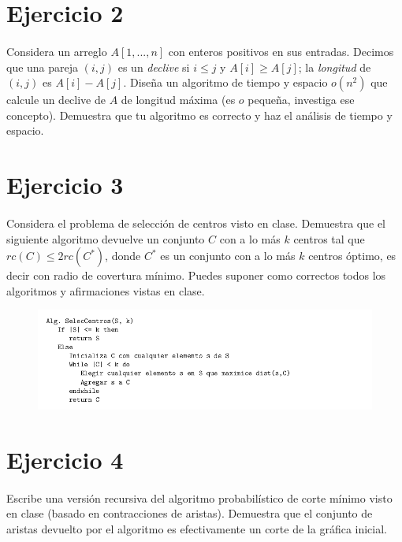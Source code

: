 \documentclass[12pt]{article}
\begin{document}
\section{Ejercicio 2}
	\paragraph{} Considera un arreglo $A[1,...,n]$ con enteros positivos en sus entradas. Decimos que una pareja $(i,j)$ es un \textit{declive} si $i\leq j$ y $A[i]\geq A[j]$; la \textit{longitud} de $(i,j)$ es $A[i] - A[j]$. Diseña un algoritmo de tiempo y espacio $o(n^2)$ que calcule un declive de $A$ de longitud máxima (es $o$ pequeña, investiga ese concepto). Demuestra que tu algoritmo es correcto y haz el análisis de tiempo y espacio.
\section{Ejercicio 3}
	\paragraph{} Considera el problema de selección de centros visto en clase. Demuestra que el siguiente algoritmo devuelve un conjunto $C$ con a lo más $k$ centros tal que $rc(C)\leq 2rc(C^*)$, donde $C^*$ es un conjunto con a lo más $k$ centros óptimo, es decir con radio de covertura mínimo. Puedes suponer como correctos todos los algoritmos y afirmaciones vistas en clase.
	\begin{figure}[h]
		\begin{center}
			\includegraphics[width=\textwidth]{AlgCentros}
		\end{center}
	\end{figure}
\pagebreak
\section{Ejercicio 4}
\paragraph{} Escribe una versión recursiva del algoritmo probabilístico de corte mínimo visto en clase (basado en contracciones de aristas). Demuestra que el conjunto de aristas devuelto por el algoritmo es efectivamente un corte de la gráfica inicial.
\end{document}
